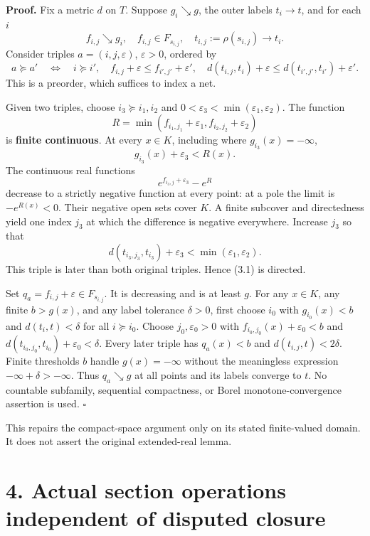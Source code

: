 \documentclass[10pt]{article}
\begin{document}
\textbf{Proof.} Fix a metric \(d\) on \(T\). Suppose \(g_i\searrow g\),
the outer labels \(t_i\to t\), and for each \(i\) \[
 f_{i,j}\searrow g_i,\quad f_{i,j}\in F_{s_{i,j}},\quad
 t_{i,j}:=\rho(s_{i,j})\to t_i.
\] Consider triples \(a=(i,j,\varepsilon)\), \(\varepsilon>0\), ordered
by \[
 a\succeq a'\quad\Longleftrightarrow\quad
 i\succeq i',\quad f_{i,j}+\varepsilon\leq f_{i',j'}+\varepsilon',\quad
 d(t_{i,j},t_i)+\varepsilon\leq d(t_{i',j'},t_{i'})+\varepsilon'.
 \tag{3.1}
\] This is a preorder, which suffices to index a net.

Given two triples, choose \(i_3\succeq i_1,i_2\) and
\(0<\varepsilon_3<\min(\varepsilon_1,\varepsilon_2)\). The function \[
 R=\min(f_{i_1,j_1}+\varepsilon_1,f_{i_2,j_2}+\varepsilon_2)
\] is \textbf{finite continuous}. At every \(x\in K\), including where
\(g_{i_3}(x)=-\infty\), \[
 g_{i_3}(x)+\varepsilon_3<R(x).
\] The continuous real functions \[
 e^{f_{i_3,j}+\varepsilon_3}-e^R
\] decrease to a strictly negative function at every point: at a pole
the limit is \(-e^{R(x)}<0\). Their negative open sets cover \(K\). A
finite subcover and directedness yield one index \(j_3\) at which the
difference is negative everywhere. Increase \(j_3\) so that \[
 d(t_{i_3,j_3},t_{i_3})+\varepsilon_3<\min(\varepsilon_1,\varepsilon_2).
\] This triple is later than both original triples. Hence (3.1) is
directed.

Set \(q_a=f_{i,j}+\varepsilon\in F_{s_{i,j}}\). It is decreasing and is
at least \(g\). For any \(x\in K\), any finite \(b>g(x)\), and any label
tolerance \(\delta>0\), first choose \(i_0\) with \(g_{i_0}(x)<b\) and
\(d(t_i,t)<\delta\) for all \(i\succeq i_0\). Choose
\(j_0,\varepsilon_0>0\) with \(f_{i_0,j_0}(x)+\varepsilon_0<b\) and
\(d(t_{i_0,j_0},t_{i_0})+\varepsilon_0<\delta\). Every later triple has
\(q_a(x)<b\) and \(d(t_{i,j},t)<2\delta\). Finite thresholds \(b\)
handle \(g(x)=-\infty\) without the meaningless expression
\(-\infty+\delta>-\infty\). Thus \(q_a\searrow g\) at all points and its
labels converge to \(t\). No countable subfamily, sequential
compactness, or Borel monotone-convergence assertion is used.
\(\square\)

This repairs the compact-space argument only on its stated finite-valued
domain. It does not assert the original extended-real lemma.

\section{4. Actual section operations independent of disputed
closure}\label{actual-section-operations-independent-of-disputed-closure}
\end{document}
